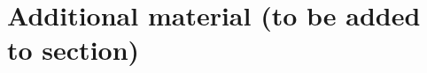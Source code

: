 \documentclass[a4paper,UKenglish,numberwithinsect,cleveref, autoref, thm-restate]{lipics-v2021}
\theoremstyle{plain} %
\newtheorem{myproposition}[mytheorem]{Proposition}
\theoremstyle{definition} %
\begin{document}
%  


\section{Additional material (to be added to section)}
\end{document}
